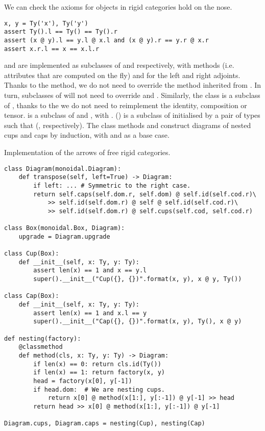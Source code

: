 \begin{example}
We can check the axioms for objects in rigid categories hold on the nose.

\begin{verbatim}
x, y = Ty('x'), Ty('y')
assert Ty().l == Ty() == Ty().r
assert (x @ y).l == y.l @ x.l and (x @ y).r == y.r @ x.r
assert x.r.l == x == x.l.r
\end{verbatim}
\end{example}

 and  are implemented as subclasses of  and  respectively, with  methods (i.e. attributes that are computed on the fly)  and  for the left and right adjoints.
Thanks to the  method, we do not need to override the  method inherited from .
In turn, subclasses of  will not need to override  and .
Similarly, the  class is a subclass of , thanks to the  we do not need to reimplement the identity, composition or tensor.
 is a subclass of  and , with .
 () is a subclass of  initialised by a pair of types  such that   (, respectively).
The class methods  and  construct diagrams of nested cups and caps by induction, with  and  as a base case.

\begin{python}
{\normalfont Implementation of the arrows of free rigid categories.}

\begin{verbatim}
class Diagram(monoidal.Diagram):
    def transpose(self, left=True) -> Diagram:
        if left: ... # Symmetric to the right case.
        return self.caps(self.dom.r, self.dom) @ self.id(self.cod.r)\
            >> self.id(self.dom.r) @ self @ self.id(self.cod.r)\
            >> self.id(self.dom.r) @ self.cups(self.cod, self.cod.r)

class Box(monoidal.Box, Diagram):
    upgrade = Diagram.upgrade

class Cup(Box):
    def __init__(self, x: Ty, y: Ty):
        assert len(x) == 1 and x == y.l
        super().__init__("Cup({}, {})".format(x, y), x @ y, Ty())

class Cap(Box):
    def __init__(self, x: Ty, y: Ty):
        assert len(x) == 1 and x.l == y
        super().__init__("Cap({}, {})".format(x, y), Ty(), x @ y)

def nesting(factory):
    @classmethod
    def method(cls, x: Ty, y: Ty) -> Diagram:
        if len(x) == 0: return cls.id(Ty())
        if len(x) == 1: return factory(x, y)
        head = factory(x[0], y[-1])
        if head.dom:  # We are nesting cups.
            return x[0] @ method(x[1:], y[:-1]) @ y[-1] >> head
        return head >> x[0] @ method(x[1:], y[:-1]) @ y[-1]

Diagram.cups, Diagram.caps = nesting(Cup), nesting(Cap)
\end{verbatim}
\end{python}

